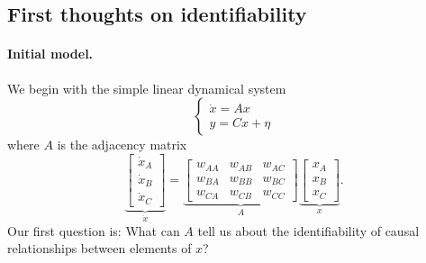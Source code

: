 \subsection{First thoughts on identifiability}

\paragraph{Initial model.} We begin with the simple linear dynamical system
\begin{equation}
    \begin{cases} \dot{x} = Ax \\ y = Cx + \eta \end{cases}
\end{equation}
where $A$ is the adjacency matrix
\begin{equation}
    \underbrace{\begin{bmatrix} \dot{x}_A \\ \dot{x}_B \\ \dot{x}_C \end{bmatrix}}_{\dot{x}} =
    \underbrace{\begin{bmatrix}
        w_{AA} & w_{AB} & w_{AC} \\
        w_{BA} & w_{BB} & w_{BC} \\
        w_{CA} & w_{CB} & w_{CC}
    \end{bmatrix}}_{A}
    \underbrace{\begin{bmatrix}
        x_A \\
        x_B \\
        x_C
    \end{bmatrix}}_{x}.
    \label{eq:lds}
\end{equation}
Our first question is: What can $A$ tell us about the identifiability of causal relationships between elements of $x$?

